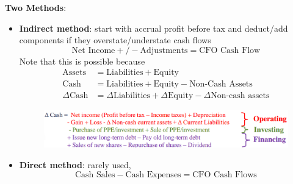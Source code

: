 \documentclass{article}
\begin{document}
\begin{multicols}{2}
\textbf{Two Methods}:
\begin{itemize}
	\item \textbf{Indirect method}: start with accrual profit before tax and deduct/add components if they overstate/understate cash flows
	$$\text{Net Income} +/- \text{Adjustments} = \text{CFO Cash Flow}$$
	Note that this is possible because
	\begin{equation*}
		\begin{aligned}
\text{Assets} &= \text{Liabilities} + \text{Equity}\\
\text{Cash}  &= \text{Liabilities} + \text{Equity} - \text{Non-Cash Assets}\\
\Delta\text{Cash} &= \Delta\text{Liabilities} + \Delta\text{Equity} - \Delta\text{Non-cash assets}
		\end{aligned}
	\end{equation*}
\begin{figure}[H]
	\centering
	\includegraphics[width=\columnwidth]{image/magic.png}
\end{figure}
	\item \textbf{Direct method}: rarely used,
	$$\text{Cash Sales} - \text{Cash Expenses} = \text{CFO Cash Flows}$$
\end{itemize}

\end{multicols}
\end{document}
